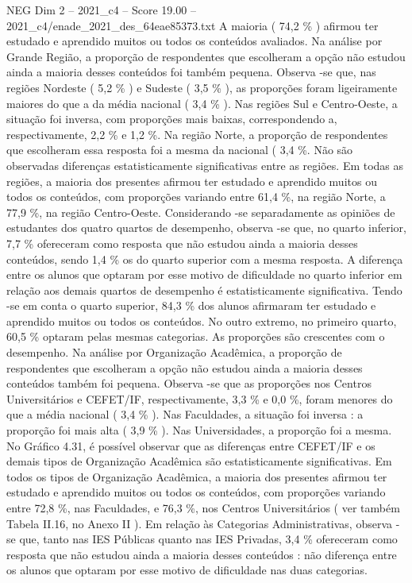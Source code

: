 \begin{textsample}{NEG Dim 2 – 2021\_c4 – Score 19.00 – 2021\_c4/enade\_2021\_des\_64eae85373.txt}
A maioria ( 74,2 \% ) afirmou ter estudado e aprendido muitos ou todos os conteúdos avaliados.
Na análise por Grande Região, a proporção de respondentes que escolheram a opção não estudou ainda a maioria desses conteúdos foi também pequena.
Observa -se que, nas regiões Nordeste ( 5,2 \% ) e Sudeste ( 3,5 \% ), as proporções foram ligeiramente maiores do que a da média nacional ( 3,4 \% ).
Nas regiões Sul e Centro-Oeste, a situação foi inversa, com proporções mais baixas, correspondendo a, respectivamente, 2,2 \% e 1,2 \%.
Na região Norte, a proporção de respondentes que escolheram essa resposta foi a mesma da nacional ( 3,4 \%.
Não são observadas diferenças estatisticamente significativas entre as regiões.
Em todas as regiões, a maioria dos presentes afirmou ter estudado e aprendido muitos ou todos os conteúdos, com proporções variando entre 61,4 \%, na região Norte, a 77,9 \%, na região Centro-Oeste.
Considerando -se separadamente as opiniões de estudantes dos quatro quartos de desempenho, observa -se que, no quarto inferior, 7,7 \% ofereceram como resposta que não estudou ainda a maioria desses conteúdos, sendo 1,4 \% os do quarto superior com a mesma resposta.
A diferença entre os alunos que optaram por esse motivo de dificuldade no quarto inferior em relação aos demais quartos de desempenho é estatisticamente significativa.
Tendo -se em conta o quarto superior, 84,3 \% dos alunos afirmaram ter estudado e aprendido muitos ou todos os conteúdos.
No outro extremo, no primeiro quarto, 60,5 \% optaram pelas mesmas categorias.
As proporções são crescentes com o desempenho.
Na análise por Organização Acadêmica, a proporção de respondentes que escolheram a opção não estudou ainda a maioria desses conteúdos também foi pequena.
Observa -se que as proporções nos Centros Universitários e CEFET/IF, respectivamente, 3,3 \% e 0,0 \%, foram menores do que a média nacional ( 3,4 \% ).
Nas Faculdades, a situação foi inversa : a proporção foi mais alta ( 3,9 \% ).
Nas Universidades, a proporção foi a mesma.
No Gráfico 4.31, é possível observar que as diferenças entre CEFET/IF e os demais tipos de Organização Acadêmica são estatisticamente significativas.
Em todos os tipos de Organização Acadêmica, a maioria dos presentes afirmou ter estudado e aprendido muitos ou todos os conteúdos, com proporções variando entre 72,8 \%, nas Faculdades, e 76,3 \%, nos Centros Universitários ( ver também Tabela II.16, no Anexo II ).
Em relação às Categorias Administrativas, observa -se que, tanto nas IES Públicas quanto nas IES Privadas, 3,4 \% ofereceram como resposta que não estudou ainda a maioria desses conteúdos : não diferença entre os alunos que optaram por esse motivo de dificuldade nas duas categorias.

\end{textsample}
